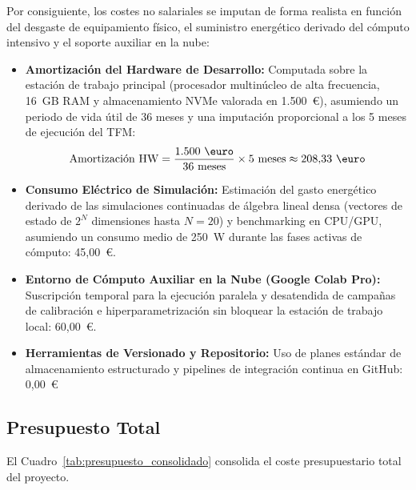 Por consiguiente, los costes no salariales se imputan de forma realista en función del 
desgaste de equipamiento físico, el suministro energético derivado del cómputo intensivo 
y el soporte auxiliar en la nube:
\begin{itemize}
    \item \textbf{Amortización del Hardware de Desarrollo:} Computada sobre la estación 
          de trabajo principal (procesador multinúcleo de alta frecuencia, 16~GB RAM y 
          almacenamiento NVMe valorada en 1.500~\euro), asumiendo un periodo de vida útil 
          de 36 meses y una imputación proporcional a los 5 meses de ejecución del TFM:
          \begin{equation}
              \text{Amortización HW} = \frac{1.500\text{ \euro}}{36\text{ meses}} \times 5\text{ meses} \approx 208{,}33\text{ \euro}
          \end{equation}
    \item \textbf{Consumo Eléctrico de Simulación:} Estimación del gasto 
          energético derivado de las simulaciones continuadas de álgebra lineal densa 
          (vectores de estado de $2^N$ dimensiones hasta $N=20$) y benchmarking en CPU/GPU, 
          asumiendo un consumo medio de 250~W durante las fases activas de cómputo: 45{,}00~\euro.
    \item \textbf{Entorno de Cómputo Auxiliar en la Nube (Google Colab Pro):} Suscripción 
          temporal para la ejecución paralela y desatendida de campañas de calibración e 
          hiperparametrización sin bloquear la estación de trabajo local: 60{,}00~\euro.
    \item \textbf{Herramientas de Versionado y Repositorio:} Uso de planes estándar de 
      almacenamiento estructurado y pipelines de integración continua en GitHub: 0{,}00~\euro\ 
\end{itemize}

\subsection{Presupuesto Total}
\label{subsec:presupuesto_consolidado}

El Cuadro~\ref{tab:presupuesto_consolidado} consolida el coste presupuestario total del 
proyecto.

